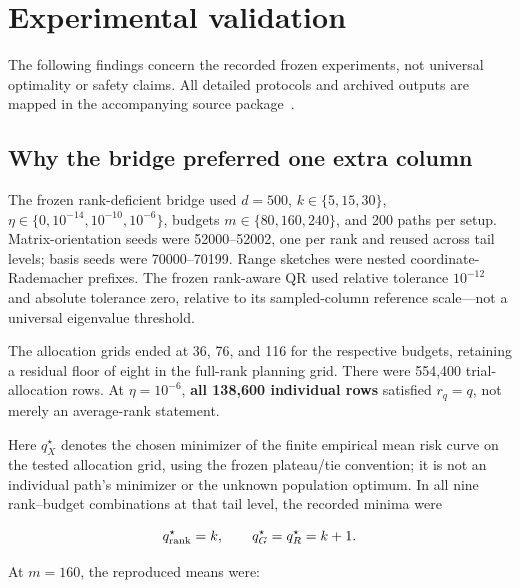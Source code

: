 \section{Experimental validation}\label{sec:experiments}
The following findings concern the recorded frozen experiments, not universal optimality or safety claims. All detailed protocols and archived outputs are mapped in the accompanying source package~\cite{project2026}.
\subsection{Why the bridge preferred one extra column}\label{exp:E1}
The frozen rank-deficient bridge used $d=500$, $k\in\{5,15,30\}$, $\eta\in\{0,10^{-14},10^{-10},10^{-6}\}$, budgets $m\in\{80,160,240\}$, and 200 paths per setup. Matrix-orientation seeds were 52000--52002, one per rank and reused across tail levels; basis seeds were 70000--70199. Range sketches were nested coordinate-Rademacher prefixes. The frozen rank-aware QR used relative tolerance $10^{-12}$ and absolute tolerance zero, relative to its sampled-column reference scale---not a universal eigenvalue threshold.


The allocation grids ended at 36, 76, and 116 for the respective budgets, retaining a residual floor of eight in the full-rank planning grid. There were 554,400 trial-allocation rows. At $\eta=10^{-6}$, \textbf{all 138,600 individual rows} satisfied $r_q=q$, not merely an average-rank statement.


Here $q_X^\star$ denotes the chosen minimizer of the finite empirical mean risk curve on the tested allocation grid, using the frozen plateau/tie convention; it is not an individual path's minimizer or the unknown population optimum. In all nine rank--budget combinations at that tail level, the recorded minima were


\begin{equation}
q_{\rm rank}^\star=k,\qquad q_G^\star=q_R^\star=k+1.
\end{equation}


At $m=160$, the reproduced means were:


